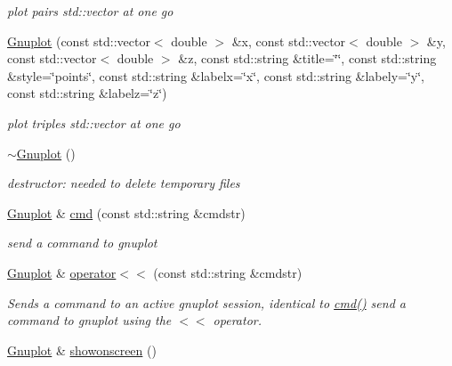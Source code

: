 \begin{DoxyCompactItemize}
\begin{DoxyCompactList}\small\item\em plot pairs std\-::vector at one go \end{DoxyCompactList}\item 
\hypertarget{class_gnuplot_a14191e89154f2716608f6907975cc012}{\hyperlink{class_gnuplot_a14191e89154f2716608f6907975cc012}{Gnuplot} (const std\-::vector$<$ double $>$ \&x, const std\-::vector$<$ double $>$ \&y, const std\-::vector$<$ double $>$ \&z, const std\-::string \&title=\char`\"{}\char`\"{}, const std\-::string \&style=\char`\"{}points\char`\"{}, const std\-::string \&labelx=\char`\"{}x\char`\"{}, const std\-::string \&labely=\char`\"{}y\char`\"{}, const std\-::string \&labelz=\char`\"{}z\char`\"{})}\label{class_gnuplot_a14191e89154f2716608f6907975cc012}

\begin{DoxyCompactList}\small\item\em plot triples std\-::vector at one go \end{DoxyCompactList}\item 
\hypertarget{class_gnuplot_a78a68f621caa87d1f34324fcd093c7bd}{\hyperlink{class_gnuplot_a78a68f621caa87d1f34324fcd093c7bd}{$\sim$\-Gnuplot} ()}\label{class_gnuplot_a78a68f621caa87d1f34324fcd093c7bd}

\begin{DoxyCompactList}\small\item\em destructor\-: needed to delete temporary files \end{DoxyCompactList}\item 
\hypertarget{class_gnuplot_a07607803ede8dd5416906df0a1924fc5}{\hyperlink{class_gnuplot}{Gnuplot} \& \hyperlink{class_gnuplot_a07607803ede8dd5416906df0a1924fc5}{cmd} (const std\-::string \&cmdstr)}\label{class_gnuplot_a07607803ede8dd5416906df0a1924fc5}

\begin{DoxyCompactList}\small\item\em send a command to gnuplot \end{DoxyCompactList}\item 
\hyperlink{class_gnuplot}{Gnuplot} \& \hyperlink{class_gnuplot_afb69631c7a498077e378a3cbb56f38c8}{operator$<$$<$} (const std\-::string \&cmdstr)
\begin{DoxyCompactList}\small\item\em Sends a command to an active gnuplot session, identical to \hyperlink{class_gnuplot_a07607803ede8dd5416906df0a1924fc5}{cmd()} send a command to gnuplot using the $<$$<$ operator. \end{DoxyCompactList}\item 
\hypertarget{class_gnuplot_a356d2faaa79f08d13fec9718b776b28d}{\hyperlink{class_gnuplot}{Gnuplot} \& \hyperlink{class_gnuplot_a356d2faaa79f08d13fec9718b776b28d}{showonscreen} ()}\label{class_gnuplot_a356d2faaa79f08d13fec9718b776b28d}


\end{DoxyCompactItemize}

